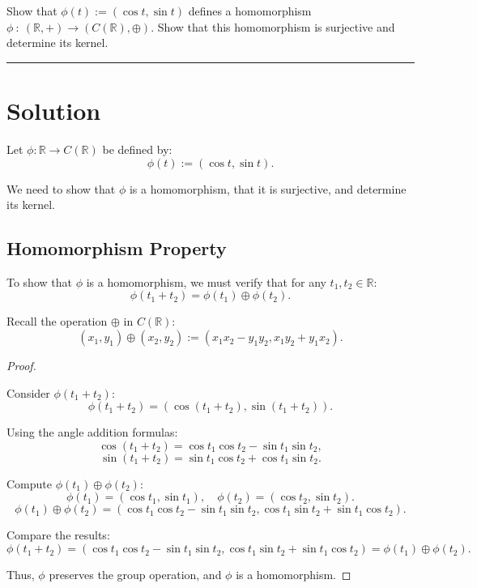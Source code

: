 \documentclass[12pt]{amsart}
\theoremstyle{definition}
\numberwithin{equation}{section}
\newcommand{\R}{\mathbb{R}}
\begin{document}
\begin{exercise}{5} Show that \(\phi(t):= (\cos t, \sin t)\) defines a homomorphism \(\phi \ : \ (\R,+) \rightarrow (C(\R), \oplus)\). Show that this homomorphism is surjective and determine its kernel.

    \noindent\rule{\linewidth}{1pt}

    
    \section*{Solution}

    Let \(\phi: \R \rightarrow C(\R)\) be defined by:
    \[
    \phi(t) := (\cos t, \sin t).
    \]
    
    We need to show that \(\phi\) is a homomorphism, that it is surjective, and determine its kernel.
    
    \subsection*{Homomorphism Property}
    
    To show that \(\phi\) is a homomorphism, we must verify that for any \(t_1, t_2 \in \R\):
    \[
    \phi(t_1 + t_2) = \phi(t_1) \oplus \phi(t_2).
    \]
    
    Recall the operation \(\oplus\) in \(C(\R)\):
    \[
    (x_1, y_1) \oplus (x_2, y_2) := (x_1 x_2 - y_1 y_2, x_1 y_2 + y_1 x_2).
    \]
    
    \begin{proof} \( \)
    
    Consider \(\phi(t_1 + t_2)\):
    \[
    \phi(t_1 + t_2) = (\cos(t_1 + t_2), \sin(t_1 + t_2)).
    \]
    
    Using the angle addition formulas:
    \[
    \cos(t_1 + t_2) = \cos t_1 \cos t_2 - \sin t_1 \sin t_2,
    \]
    \[
    \sin(t_1 + t_2) = \sin t_1 \cos t_2 + \cos t_1 \sin t_2.
    \]
    
    Compute \(\phi(t_1) \oplus \phi(t_2)\):
    \[
    \phi(t_1) = (\cos t_1, \sin t_1), \quad \phi(t_2) = (\cos t_2, \sin t_2).
    \]
    \[
    \phi(t_1) \oplus \phi(t_2) = (\cos t_1 \cos t_2 - \sin t_1 \sin t_2, \cos t_1 \sin t_2 + \sin t_1 \cos t_2).
    \]
    
    Compare the results:
    \[
    \phi(t_1 + t_2) = (\cos t_1 \cos t_2 - \sin t_1 \sin t_2, \cos t_1 \sin t_2 + \sin t_1 \cos t_2) = \phi(t_1) \oplus \phi(t_2).
    \]
    
    Thus, \(\phi\) preserves the group operation, and \(\phi\) is a homomorphism.
    

\end{proof}
\end{exercise}
\end{document}
